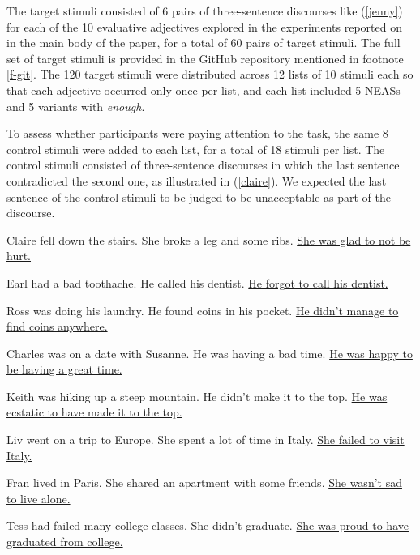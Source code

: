 \documentclass[11pt,fleqn]{article}
\newcommand{\6}{\mbox{$[\hspace*{-.6mm}[$}}
\newcommand{\9}{\mbox{$]\hspace*{-.6mm}]$}}
\begin{document}
The target stimuli consisted of 6 pairs of three-sentence discourses like (\ref{jenny}) for each of the 10 evaluative adjectives explored in the experiments reported on in the main body of the paper, for a total of 60 pairs of target stimuli. The full set of target stimuli is provided in the GitHub repository mentioned in footnote \ref{f-git}. The 120 target stimuli were distributed across 12 lists of 10 stimuli each so that each adjective occurred only once per list, and each list included 5 NEASs and 5 variants with {\em enough}. 

To assess whether participants were paying attention to the task, the same 8 control stimuli were added to each list, for a total of 18 stimuli per list. The control stimuli consisted of three-sentence discourses in
which the last sentence contradicted the second one, as illustrated in
(\ref{claire}). We expected the last sentence of the control stimuli to be judged to be unacceptable as part of the discourse.

\begin{exe} 
\ex\label{claire} 
\begin{xlist}
\ex Claire fell down the stairs. She broke a leg and some ribs. \uline{She was glad to not be hurt.} 

\ex Earl had a bad toothache. He called his dentist. \uline{He forgot to call his dentist.}

\ex Ross was doing his laundry. He found coins in his pocket. \uline{He didn't manage to find coins anywhere.}

\ex Charles was on a date with Susanne. He was having a bad time. \uline{He was happy to be having a great time.}

\ex Keith was hiking up a steep mountain. He didn't make it to the top. \uline{He was ecstatic to have made it to the top.}

\ex Liv went on a trip to Europe. She spent a lot of time in Italy. \uline{She failed to visit Italy.}

\ex Fran lived in Paris. She shared an apartment with some friends. \uline{She wasn't sad to live alone.}

\ex Tess had failed many college classes. She didn't graduate. \uline{She was proud to have graduated from college.}

\end{xlist}
\end{exe}
\end{document}
